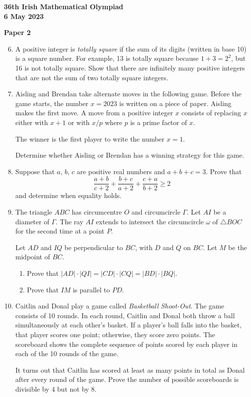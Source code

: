\documentclass[12pt]{article}
\begin{document}
\newpage
\begin{center}
{\large\bfseries 36th Irish Mathematical Olympiad\\6 May 2023}
\end{center}
\bigskip\noindent\textbf{Paper 2}\bigskip
\begin{enumerate}
\setcounter{enumi}{5}
\item A positive integer is \textit{totally square} if the sum of its digits (written in base 10) is a square number. For example, 13 is totally square because $1 + 3 = 2^2$, but 16 is not totally square. Show that there are infinitely many positive integers that are not the sum of two totally square integers.

\item Aisling and Brendan take alternate moves in the following game. Before the game starts, the number $x = 2023$ is written on a piece of paper. Aisling makes the first move. A move from a positive integer $x$ consists of replacing $x$ either with $x + 1$ or with $x/p$ where $p$ is a prime factor of $x$.

The winner is the first player to write the number $x = 1$.

Determine whether Aisling or Brendan has a winning strategy for this game.

\item Suppose that $a$, $b$, $c$ are positive real numbers and $a + b + c = 3$. Prove that
\[
\frac{a+b}{c+2} + \frac{b+c}{a+2} + \frac{c+a}{b+2} \ge 2
\]
and determine when equality holds.

\item The triangle $ABC$ has circumcentre $O$ and circumcircle $\Gamma$. Let $AI$ be a diameter of $\Gamma$. The ray $AI$ extends to intersect the circumcircle $\omega$ of $\triangle BOC$ for the second time at a point $P$.

Let $AD$ and $IQ$ be perpendicular to $BC$, with $D$ and $Q$ on $BC$. Let $M$ be the midpoint of $BC$.
\begin{enumerate}
\item[(a)] Prove that $|AD| \cdot |QI| = |CD| \cdot |CQ| = |BD| \cdot |BQ|$.
\item[(b)] Prove that $IM$ is parallel to $PD$.
\end{enumerate}

\item Caitlin and Donal play a game called \textit{Basketball Shoot-Out}. The game consists of 10 rounds. In each round, Caitlin and Donal both throw a ball simultaneously at each other's basket. If a player's ball falls into the basket, that player scores one point; otherwise, they score zero points. The scoreboard shows the complete sequence of points scored by each player in each of the 10 rounds of the game.

It turns out that Caitlin has scored at least as many points in total as Donal after every round of the game. Prove the number of possible scoreboards is divisible by 4 but not by 8.
\end{enumerate}
\end{document}
